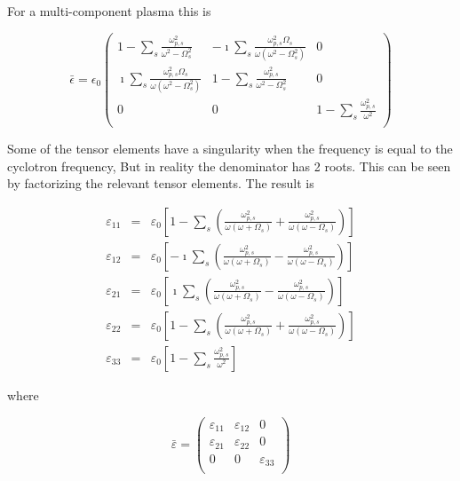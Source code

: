\documentclass[a4paper,11pt]{thesis}
\begin{document}
For a multi-component plasma this is

\begin{equation}
 \label{gyrotropic_tensor3_collless_multi_comp}
 \bar{\epsilon}=\epsilon_0\left(%
 \begin{array}{ccc}
 1-\sum_s \frac{\omega_{p,s}^2}{\omega^2 -\Omega_s^2} & - \imath \sum_s \frac{\omega_{p,s}^2 \Omega_s}{\omega(\omega^2-\Omega_s^2)} & 0 \\
 \imath \sum_s \frac{\omega_{p,s}^2 \Omega_s}{\omega(\omega^2-\Omega_s^2)} & 1- \sum_s \frac{\omega_{p,s}^2}{\omega^2 -\Omega_s^2} & 0 \\
 0 & 0 & 1- \sum_s \frac{\omega_{p,s}^2}{\omega^2} \\
 \end{array}
  \right)
  \end{equation}

Some of the tensor elements have a singularity when the frequency is equal to the cyclotron frequency, But in reality the denominator has 2 roots. This can be seen by factorizing the relevant tensor elements. The result is

\begin{eqnarray}
 \varepsilon_{11}&=&\varepsilon_0 \left[ 1-\sum_s \left( \frac{\omega_{p,s}^2}{\omega (\omega +\Omega_s)}+\frac{\omega_{p,s}^2}{\omega (\omega -\Omega_s)} \right)\right] \\
 \varepsilon_{12}&=&\varepsilon_0 \left[ -\imath \sum_s\left( \frac{\omega_{p,s}^2}{\omega (\omega +\Omega_s)}-\frac{\omega_{p,s}^2}{\omega (\omega -\Omega_s)} \right)\right] \\
 \varepsilon_{21}&=&\varepsilon_0 \left[ \imath \sum_s \left( \frac{\omega_{p,s}^2}{\omega (\omega +\Omega_s)}-\frac{\omega_{p,s}^2}{\omega (\omega -\Omega_s)} \right)\right] \\
 \varepsilon_{22}&=&\varepsilon_0 \left[ 1-\sum_s \left( \frac{\omega_{p,s}^2}{\omega (\omega +\Omega_s)}+\frac{\omega_{p,s}^2}{\omega (\omega -\Omega_s)} \right)\right] \\
 \varepsilon_{33}&=&\varepsilon_0 \left[ 1-\sum_s \frac{\omega_{p,s}^2}{\omega^2}\right]
\end{eqnarray}

where

\begin{equation}
 \bar{\varepsilon}=\left(
 \begin{array}{ccc}
  \varepsilon_{11} & \varepsilon_{12} & 0 \\
\varepsilon_{21}  & \varepsilon_{22} & 0 \\
 0 & 0 &  \varepsilon_{33}\\
 \end{array}
  \right)
  \end{equation}\\
\end{document}
